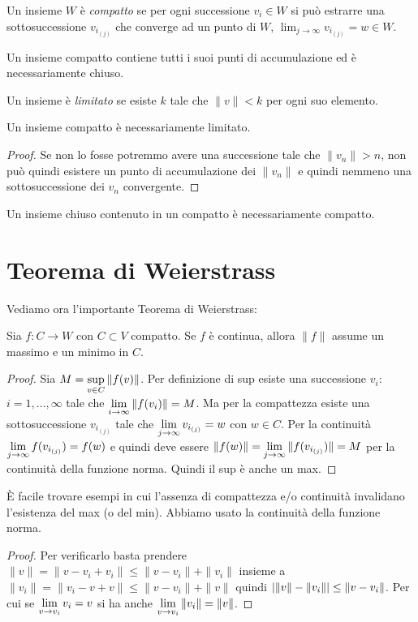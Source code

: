 \begin{definition}[compatto]
Un insieme $W$ è \emph{compatto} se per ogni successione $v_i\in W$ si può
estrarre una sottosuccessione $v_{i_{(j)}}$ che converge ad un punto di $W$,
$\lim_{j \to \infty} v_{i_{(j)}} = w \in W$.
\end{definition}

Un insieme compatto contiene tutti i suoi punti di accumulazione ed
è necessariamente chiuso.

\begin{definition}[limitato]
Un insieme è \emph{limitato} se esiste $k$ tale che $\|v\| < k$ per ogni
suo elemento.
\end{definition}

\begin{lemma}
Un insieme compatto è necessariamente limitato.
\end{lemma}
\begin{proof}
Se non lo fosse potremmo avere una successione tale che $\|v_n\| > n$, non
può quindi esistere un punto di accumulazione dei $\|v_n\|$ e quindi nemmeno
una sottosuccessione dei $v_n$ convergente.
\end{proof}
\begin{corollary}
Un insieme chiuso contenuto in un compatto è necessariamente compatto.
\end{corollary}

\section{Teorema di Weierstrass}
Vediamo ora l'importante Teorema di Weierstrass:
\begin{theorem}[di Weierstrass]
Sia $f: C \to W$ con $C \subset V$ compatto. Se $f$ è continua, allora
$\|f\|$ assume un massimo e un minimo in $C$.
\end{theorem}
\begin{proof}
Sia $\displaystyle M = \sup_{v \in C} \|f(v)\|$. Per definizione di sup esiste una
successione $v_i$: $i = 1, \ldots, \infty$ tale che 
$ \displaystyle \lim_{i \to \infty} \|f(v_i)\| = M$. Ma per la compattezza esiste
una sottosuccessione $v_{i_{(j)}}$ tale che 
$\displaystyle \lim_{j \to \infty} v_{i_{(j)}} = w$ con $w \in C$.
Per la continuità $\displaystyle \lim_{j \to \infty} f(v_{i_{(j)}}) = f(w)$ e quindi
deve essere $ \displaystyle \|f(w)\| = \lim_{j \to \infty} \|f(v_{i_{(j)}})\| = M$
per la continuità della funzione norma. Quindi il sup è anche un max. 
\end{proof}
È facile trovare esempi in cui l'assenza di compattezza e/o continuità
invalidano l'esistenza del max (o del min).
Abbiamo usato la continuità della funzione norma.
\begin{proof}
Per verificarlo basta prendere $\|v\|=\|v-v_i+v_i\| \leq \|v-v_i\|+\|v_i\|$
insieme a $\|v_i\| = \|v_i - v + v\| \leq \|v - v_i\| + \|v\|$ quindi
${\left|\|v\| - \|v_i\|\right|} \leq \|v-v_i\|$. Per cui se 
$\displaystyle \lim_{v \to v_i} v_i = v$ si ha anche
$\displaystyle \lim_{v \to v_i} \|v_i\| = \|v\|$.
\end{proof}

